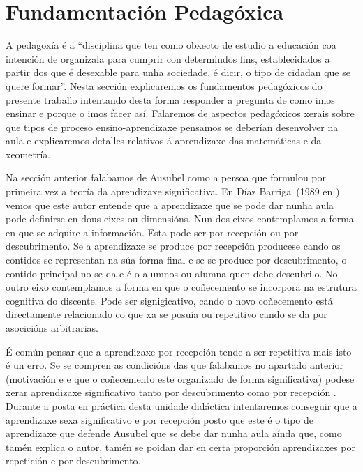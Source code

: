 
\section{Fundamentación Pedagóxica}

A pedagoxía é a ``disciplina que ten como obxecto de estudio a educación coa intención de organizala para cumprir con determindos fins, establecidados a partir dos que é desexable para unha sociedade, é dicir, o tipo de cidadan que se quere formar''\cite{wiki:pedagogia}. Nesta sección explicaremos os fundamentos pedagóxicos do presente traballo intentando desta forma responder a pregunta de como imos ensinar e porque o imos facer así. Falaremos de aspectos pedagóxicos xerais sobre que tipos de proceso ensino-aprendizaxe pensamos se deberían desenvolver na aula e explicaremos detalles relativos á aprendizaxe das matemáticas e da xeometría.

Na sección anterior falabamos de Ausubel como a persoa que formulou por primeira vez a teoría da aprendizaxe significativa. En Díaz Barriga~(1989 en ) vemos que este autor entende que a aprendizaxe que se pode dar nunha aula pode definirse en dous eixes ou dimensións. Nun dos eixos contemplamos a forma en que se adquire a información. Esta pode ser por recepción ou por descubrimento. Se a aprendizaxe se produce por recepción producese cando os contidos se representan na súa forma final e se se produce por descubrimento, o contido principal no se da e é o alumnos ou alumna quen debe descubrilo. No outro eixo contemplamos a forma en que o coñecemento se incorpora na estrutura cognitiva do discente. Pode ser signigicativo, cando o novo coñecemento está directamente relacionado co que xa se posuía ou repetitivo cando se da por asocicións arbitrarias.

É común pensar que a aprendizaxe por recepción tende a ser repetitiva mais isto é un erro. Se se compren as condicións das que falabamos no apartado anterior (motivación e e que o coñecemento este organizado de forma significativa) podese xerar aprendizaxe significativo tanto por descubrimento como por recepción \cite{unedpsicoedu}. Durante a posta en práctica desta unidade didáctica intentaremos conseguir que a aprendizaxe sexa significativo e por recepción posto que este é o tipo de aprendizaxe que defende Ausubel que se debe dar nunha aula aínda que, como tamén explica o autor, tamén se poidan dar en certa proporción aprendizaxes por repetición e por descubrimento.
